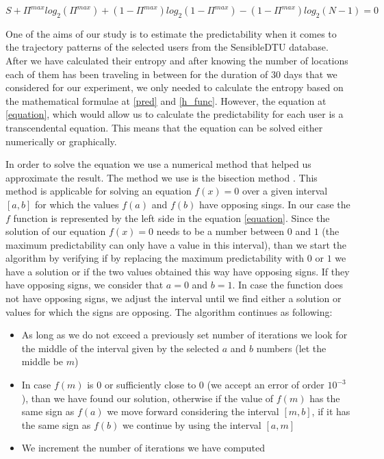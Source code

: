 \begin{equation}
\label{equation}
S + \Pi^{max}log_{2}(\Pi^{max}) + (1-\Pi^{max})log_{2}(1-\Pi^{max}) - (1 -
\Pi^{max})log_{2}(N-1) = 0
\end{equation}

One of the aims of our study is to estimate the predictability when it comes to
the trajectory patterns of the selected users from the SensibleDTU database.
After we have calculated their entropy and after knowing the number of locations
each of them has been traveling in between for the duration of $30$ days that we
considered for our experiment, we only needed to calculate the entropy based on
the mathematical formulae at \ref{pred} and \ref{h_func}. However, the equation
at \ref{equation}, which would allow us to calculate the predictability for each
user is a transcendental equation. This means that the equation can be solved
either numerically or graphically.

In order to solve the equation we use a numerical method that helped us
approximate the result. The method we use is the bisection method \cite{faires}.
This method is applicable for solving an equation $f(x) = 0$ over a given
interval $[a,b]$ for which the values $f(a)$ and $f(b)$ have opposing sings. In
our case the $f$ function is represented by the left side in the equation
\ref{equation}. Since the solution of our equation $f(x) = 0$ needs to be a
number between $0$ and $1$ (the maximum predictability can only have a value in
this interval), than we start the algorithm by verifying if by replacing the maximum
predictability with $0$ or $1$ we have a solution or if the two values obtained
this way have opposing signs. If they have opposing signs, we consider that $a = 0$
and $b = 1$. In case the function does not have opposing signs, we adjust the
interval until we find either a solution or values for which the signs are
opposing. The algorithm continues as following:
\begin{itemize}
  \item As long as we do not exceed a previously set number of iterations we
  look for the middle of the interval given by the selected $a$ and $b$ numbers
  (let the middle be $m$)
  \item In case $f(m)$ is $0$ or sufficiently close to $0$ (we accept an error
  of order $10^{-3}$), than we have found our solution, otherwise if the value of
  $f(m)$ has the same sign as $f(a)$ we move forward considering the interval
  $[m,b]$, if it has the same sign as $f(b)$ we continue by using the interval
  $[a,m]$
  \item We increment the number of iterations we have computed
\end{itemize}


